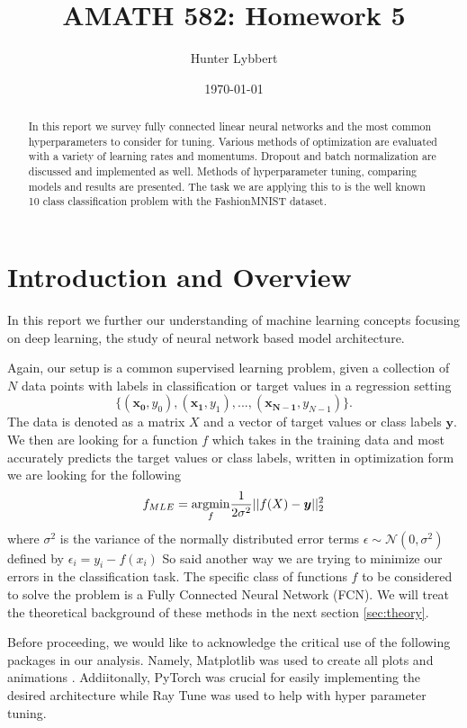\documentclass[11pt]{amsart}
\title{AMATH 582: Homework 5}
\author{Hunter Lybbert} %
\date{\today} %
\begin{document}
\maketitle

\begin{abstract}
    In this report we survey fully connected linear neural networks and the most common hyperparameters to consider for tuning.
    Various methods of optimization are evaluated with a variety of learning rates and momentums.
    Dropout and batch normalization are discussed and implemented as well.
    Methods of hyperparameter tuning, comparing models and results are presented.
    The task we are applying this to is the well known 10 class classification problem with the FashionMNIST dataset.
\end{abstract}

\section{Introduction and Overview}\label{sec:Introduction}
In this report we further our understanding of machine learning concepts focusing on deep learning, the study of neural network based model architecture.

Again, our setup is a common supervised learning problem, given a collection of $N$ data points with labels in classification or target values in a regression setting $$\big\{(\bm{x_0}, y_0), (\bm{x_1}, y_1), ..., (\bm{x_{N-1}}, y_{N-1})\big\}.$$
The data is denoted as a matrix $X$ and a vector of target values or class labels $\bm y$.
We then are looking for a function $f$ which takes in the training data and most accurately predicts the target values or class labels, written in optimization form we are looking for the following
\begin{equation}
f_{MLE} = \underset{f}{\rm argmin } \frac 1 {2 \sigma^2}|| f(X) - \bm y ||_2^2
\label{eq:basic_ml_setup}
\end{equation}
where $\sigma^2$ is the variance of the normally distributed error terms $\epsilon \sim \mathcal N (0, \sigma^2)$ defined by $\epsilon_i = y_i - f(x_i)$
So said another way we are trying to minimize our errors in the classification task.
The specific class of functions $f$ to be considered to solve the problem is a Fully Connected Neural Network (FCN).
We will treat the theoretical background of these methods in the next section \ref{sec:theory}.

Before proceeding, we would like to acknowledge the critical use of the following packages in our analysis.
Namely, Matplotlib was used to create all plots and animations \cite{Hunter:2007}.
Addiitonally, PyTorch \cite{Ansel_PyTorch_2_Faster_2024} was crucial for easily implementing the desired architecture while Ray Tune \cite{liaw2018tune} was used to help with hyper parameter tuning.
\end{document}
